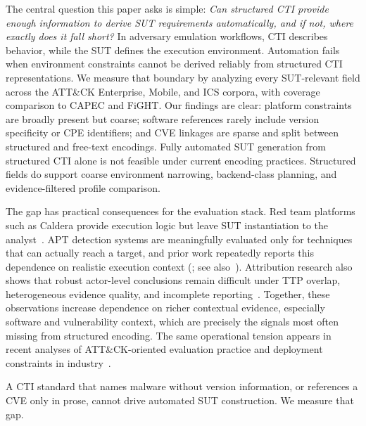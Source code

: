 \documentclass[sigconf,anonymous,review]{acmart}
\newcommand{\attack}{ATT\&CK\xspace}
\newcommand{\caldera}{Caldera\xspace}
\begin{document}
The central question this paper asks is simple: \emph{Can structured CTI provide enough information to derive SUT requirements automatically, and if not, where exactly does it fall short?} In adversary emulation workflows, CTI describes behavior, while the SUT defines the execution environment. Automation fails when environment constraints cannot be derived reliably from structured CTI representations. We measure that boundary by analyzing every SUT-relevant field across the \attack{} Enterprise, Mobile, and ICS corpora, with coverage comparison to CAPEC and FiGHT\@. Our findings are clear: platform constraints are broadly present but coarse; software references rarely include version specificity or CPE identifiers; and CVE linkages are sparse and split between structured and free-text encodings. Fully automated SUT generation from structured CTI alone is not feasible under current encoding practices. Structured fields do support coarse environment narrowing, backend-class planning, and evidence-filtered profile comparison.

The gap has practical consequences for the evaluation stack. Red team platforms such as \caldera{} provide execution logic but leave SUT instantiation to the analyst~\cite{applebaum2016caldera,redcanary2023art,orbinato2024laccolith,damodaran2025automated,wang2024sands}. APT detection systems are meaningfully evaluated only for techniques that can actually reach a target, and prior work repeatedly reports this dependence on realistic execution context (\cite{milajerdi2019holmes,han2020unicorn,DBLP:conf/uss/Dong0NS0LLX23,DBLP:conf/uss/YangXXLZ23,DBLP:conf/ccs/LvGQCZCJ24,DBLP:conf/sp/RehmanAH24}; see also~\cite{Li_2024,Cheng_2024,DBLP:conf/uss/JiaXN0ZW24,DBLP:conf/ccs/Aly0Y25,DBLP:conf/uss/Zhang0YK0KF25}). Attribution research also shows that robust actor-level conclusions remain difficult under TTP overlap, heterogeneous evidence quality, and incomplete reporting~\cite{DBLP:conf/uss/SahaMBCVL25,DBLP:conf/ccs/YuldoshkhujaevJ25}. Together, these observations increase dependence on richer contextual evidence, especially software and vulnerability context, which are precisely the signals most often missing from structured encoding. The same operational tension appears in recent analyses of ATT\&CK-oriented evaluation practice and deployment constraints in industry~\cite{DBLP:conf/uss/VirkudIR00024,10.1145/3634737.3645012,DBLP:conf/ccs/DongLJLWHXCLGC23}.

A CTI standard that names malware without version information, or references a CVE only in prose, cannot drive automated SUT construction. We measure that gap.
\end{document}
